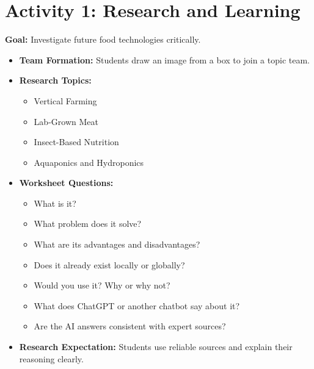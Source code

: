 \documentclass[11pt, a4paper]{article}
\begin{document}
\section{Activity 1: Research and Learning}
\textbf{Goal:} Investigate future food technologies critically.
\begin{itemize}
    \item \textbf{Team Formation:} Students draw an image from a box to join a topic team.
    \item \textbf{Research Topics:}
    \begin{itemize}
        \item Vertical Farming
        \item Lab-Grown Meat
        \item Insect-Based Nutrition
        \item Aquaponics and Hydroponics
    \end{itemize}
    \item \textbf{Worksheet Questions:}
    \begin{itemize}
        \item What is it?
        \item What problem does it solve?
        \item What are its advantages and disadvantages?
        \item Does it already exist locally or globally?
        \item Would you use it? Why or why not?
        \item What does ChatGPT or another chatbot say about it?
        \item Are the AI answers consistent with expert sources?
    \end{itemize}
    \item \textbf{Research Expectation:} Students use reliable sources and explain their reasoning clearly.
\end{itemize}
\end{document}
